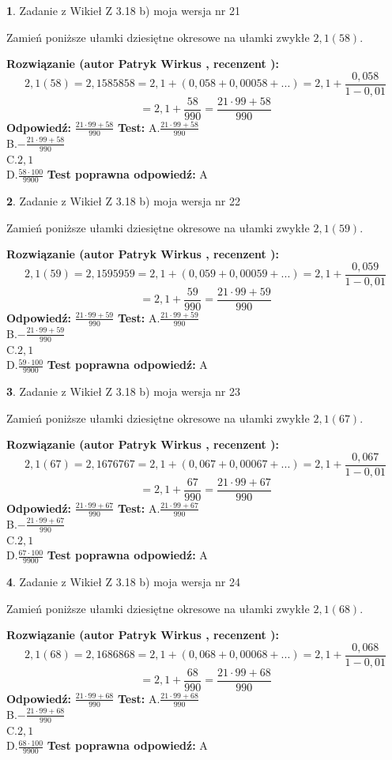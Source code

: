\documentclass[12pt, a4paper]{article}
\theoremstyle{definition} %
\newtheorem{zad}{}
\newcommand{\zadStart}[1]{\begin{zad}#1\newline}
\newcommand{\zadStop}{\end{zad}}
\newcommand{\rozwStart}[2]{\noindent \textbf{Rozwiązanie (autor #1 , recenzent #2): }\newline}
\newcommand{\rozwStop}{\newline}
\newcommand{\odpStart}{\noindent \textbf{Odpowiedź:}\newline}
\newcommand{\odpStop}{\newline}
\newcommand{\testStart}{\noindent \textbf{Test:}\newline}
\newcommand{\testStop}{\newline}
\newcommand{\kluczStart}{\noindent \textbf{Test poprawna odpowiedź:}\newline}
\newcommand{\kluczStop}{\newline}
\begin{document}
\zadStart{Zadanie z Wikieł Z 3.18 b) moja wersja nr 21}

Zamień poniższe ułamki dziesiętne okresowe na ułamki zwykłe $2,1(58)$.
\zadStop
\rozwStart{Patryk Wirkus}{}
$$2,1(58)=2,1585858=2,1+(0,058+0,00058+...)=2,1+\frac{0,058}{1-0,01}$$
$$=2,1+\frac{58}{990}=\frac{21\cdot99+58}{990}$$
\rozwStop
\odpStart
$\frac{21\cdot99+58}{990}$
\odpStop
\testStart
A.$\frac{21\cdot99+58}{990}$\\ B.$-\frac{21\cdot99+58}{990}$\\ C.$2,1$\\ D.$\frac{58\cdot100}{9900}$
\testStop
\kluczStart
A
\kluczStop



\zadStart{Zadanie z Wikieł Z 3.18 b) moja wersja nr 22}

Zamień poniższe ułamki dziesiętne okresowe na ułamki zwykłe $2,1(59)$.
\zadStop
\rozwStart{Patryk Wirkus}{}
$$2,1(59)=2,1595959=2,1+(0,059+0,00059+...)=2,1+\frac{0,059}{1-0,01}$$
$$=2,1+\frac{59}{990}=\frac{21\cdot99+59}{990}$$
\rozwStop
\odpStart
$\frac{21\cdot99+59}{990}$
\odpStop
\testStart
A.$\frac{21\cdot99+59}{990}$\\ B.$-\frac{21\cdot99+59}{990}$\\ C.$2,1$\\ D.$\frac{59\cdot100}{9900}$
\testStop
\kluczStart
A
\kluczStop



\zadStart{Zadanie z Wikieł Z 3.18 b) moja wersja nr 23}

Zamień poniższe ułamki dziesiętne okresowe na ułamki zwykłe $2,1(67)$.
\zadStop
\rozwStart{Patryk Wirkus}{}
$$2,1(67)=2,1676767=2,1+(0,067+0,00067+...)=2,1+\frac{0,067}{1-0,01}$$
$$=2,1+\frac{67}{990}=\frac{21\cdot99+67}{990}$$
\rozwStop
\odpStart
$\frac{21\cdot99+67}{990}$
\odpStop
\testStart
A.$\frac{21\cdot99+67}{990}$\\ B.$-\frac{21\cdot99+67}{990}$\\ C.$2,1$\\ D.$\frac{67\cdot100}{9900}$
\testStop
\kluczStart
A
\kluczStop



\zadStart{Zadanie z Wikieł Z 3.18 b) moja wersja nr 24}

Zamień poniższe ułamki dziesiętne okresowe na ułamki zwykłe $2,1(68)$.
\zadStop
\rozwStart{Patryk Wirkus}{}
$$2,1(68)=2,1686868=2,1+(0,068+0,00068+...)=2,1+\frac{0,068}{1-0,01}$$
$$=2,1+\frac{68}{990}=\frac{21\cdot99+68}{990}$$
\rozwStop
\odpStart
$\frac{21\cdot99+68}{990}$
\odpStop
\testStart
A.$\frac{21\cdot99+68}{990}$\\ B.$-\frac{21\cdot99+68}{990}$\\ C.$2,1$\\ D.$\frac{68\cdot100}{9900}$
\testStop
\kluczStart
A
\kluczStop
\end{document}
